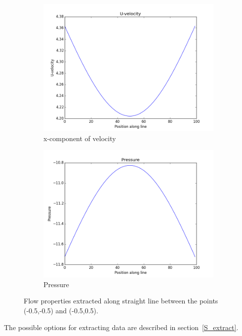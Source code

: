 \documentclass[10pt,a4paper]{article}
\begin{document}
\begin{figure}
\centering
\begin{subfigure}{0.48\textwidth}
    \includegraphics[width=1.0\textwidth]{Figures/U-velocity}
  \caption{x-component of velocity}
\end{subfigure}
\hfill
\begin{subfigure}{0.48\textwidth}
    \includegraphics[width=1.0\textwidth]{Figures/P-trace}
  \caption{Pressure}
\end{subfigure}
\caption{Flow properties extracted along straight line between the points (-0.5,-0.5) and (-0.5,0.5).}
\label{F_extract_test}
\end{figure}


The possible options for extracting data are described in section~\ref{S_extract}.
\end{document}
